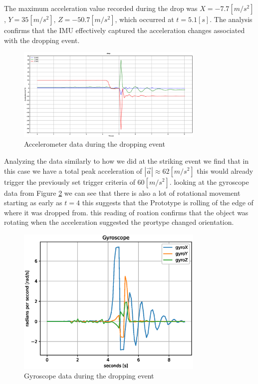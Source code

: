 \documentclass[../main.tex]{subfiles}
\begin{document}
The maximum acceleration value recorded during the
drop was
$X = -7.7 [m/s^2]$, $Y = 35 [m/s^2]$, $Z = -50.7 [m/s^2]$,
which occurred at $t = 5.1[s]$.
The analysis confirms that the IMU effectively captured the
acceleration changes associated with the dropping event.

\begin{figure}[htbp]
    \centering
    \includegraphics[width=0.8\textwidth]{resources/figures/Acceleration_drop.eps}
    \caption{Accelerometer data during the dropping event}
    \label{fig:accelerometer_dropping}
\end{figure}

Analyzing the data similarly to how we did at the striking event we find that in this case we have a total peak acceleration of $|\overrightarrow{a}| \approx 62 [m/s^2]$ this would already trigger the previously set trigger criteria of $60 [m/s^2]$. looking at the gyroscope data from Figure \ref{fig:gyroscope_dropping} we can see that there is also a lot of rotational movement starting as early as $t=4$ this suggests that the Prototype is rolling of the edge of where it was dropped from. this reading of roation confirms that the object was rotating when the acceleration suggested the prortype changed orientation.

\begin{figure}[htbp]
    \centering
    \includegraphics[width=0.8\textwidth]{resources/figures/Gyro_drop.eps}
    \caption{Gyroscope data during the dropping event}
    \label{fig:gyroscope_dropping}
\end{figure}
\end{document}

